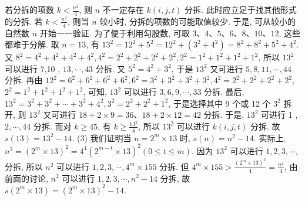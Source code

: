 若分拆的项数 $k<\frac{n^2}{4}$, 则 $n$ 不一定存在 $k (i, j, t)$ 分拆.
此时应立足于找其他形式的分拆.
若 $k<\frac{n^2}{4}$, 则当 $n$ 较小时, 分拆的项数的可能取值较少.
于是, 可从较小的自然数 $n$ 开始一一验证.
为了便于利用勾股数, 可取 $3 、 4 、 5 、 6 、 8 、 10 、 12$, 这些都难于分解.
取 $n=13$, 有 $13^2=12^2+5^2=12^2+\left(3^2+4^2\right)=8^2+8^2+5^2+4^2$. 又 $8^2=4^2+4^2+4^2+ 4^2, 4^2=2^2+2^2+2^2+2^2, 2^2=1^2+1^2+1^2+1^2$, 所以 $13^2$ 可以进行 7,10 , $13, \cdots, 43$ 分拆.
又 $5^2=4^2+3^2$, 于是 $13^2$ 又可进行 $5,8,11, \cdots, 44$ 分拆.
再由 $12^2=6^2+6^2+6^2+6^2, 6^2=3^2+3^2+3^2+3^2, 4^2=2^2+2^2+2^2+2^2$, $2^2=1^2+1^2+1^2+1^2$, 可知, $13^2$ 可以进行 $3,6,9, \cdots, 33$ 分拆.
最后, $13^2= 3^2+3^2+\cdots+3^2+4^2, 3^2=2^2+2^2+1^2$, 于是选择其中 9 个或 12 个 $3^2$ 拆开, 则 $13^2$ 又可进行 $18+2 \times 9=36 、 18+2 \times 12=42$ 分拆.
于是, $13^2$ 可进行 1 , $2, \cdots, 44$ 分拆.
而对 $k \geqslant 45$, 有 $k \geqslant \frac{13^2}{4}$, 所以 $13^2$ 可以进行 $k(i, j, t)$ 分拆.
故 $s(13)=13^2-14$. 
(3) 我们证明当 $n=2^m \times 13$ 时, $s(n)=n^2-14$. 实际上, $n^2=\left(2^m \times 13\right)^2=4^4\left(2^{m-t} \times 13\right)^2(0 \leqslant t \leqslant m)$. 因为 $13^2$ 可以进行 $1,2,3, \cdots$, 分拆, 所以 $n^2$ 可以进行 $1,2,3, \cdots, 4^m \times 155$ 分拆.
但 $4^m \times 155> \frac{\left(2^m \times 13\right)^2}{4}=\frac{n^2}{4}$, 由前面的讨论, $n^2$ 可以进行 $1,2,3, \cdots, n^2-14$ 分拆, 故 $s\left(2^m \times 13\right)=\left(2^m \times 13\right)^2-14$.



